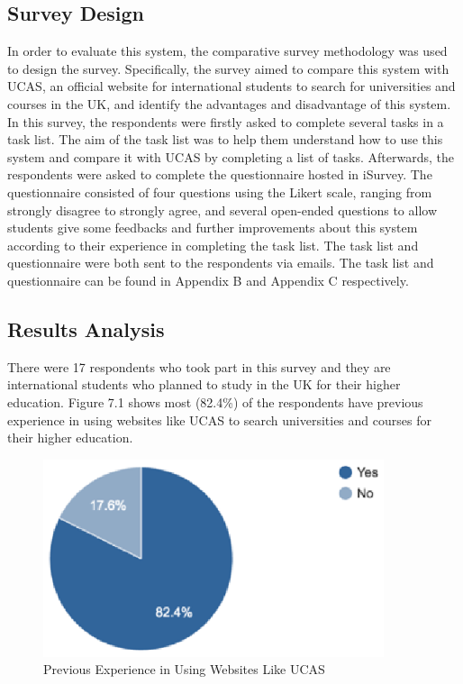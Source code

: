\subsection{Survey Design
}

In order to evaluate this system, the comparative survey methodology was used to design the survey. Specifically, the survey aimed to compare this system with UCAS, an official website for international students to search for universities and courses in the UK, and identify the advantages and disadvantage of this system. In this survey, the respondents were firstly asked to complete several tasks in a task list. The aim of the task list was to help them understand how to use this system and compare it with UCAS by completing a list of tasks. Afterwards, the respondents were asked to complete the questionnaire hosted in iSurvey. The questionnaire consisted of four questions using the Likert scale, ranging from strongly disagree to strongly agree, and several open-ended questions to allow students give some feedbacks and further improvements about this system according to their experience in completing the task list. The task list and questionnaire were both sent to the respondents via emails. The task list and questionnaire can be found in Appendix B and Appendix C respectively.


\subsection{Results Analysis}


There were 17 respondents who took part in this survey and they are international students who planned to study in the UK for their higher education. Figure 7.1 shows most (82.4\%) of the respondents have previous experience in using websites like UCAS to search universities and courses for their higher education. 


\begin{figure}[H]
  \centering
  \includegraphics[width=10cm]{./img/Picture29}
  \caption{Previous Experience in Using Websites Like UCAS
}
  \label{Figure:figex}
\end{figure}


